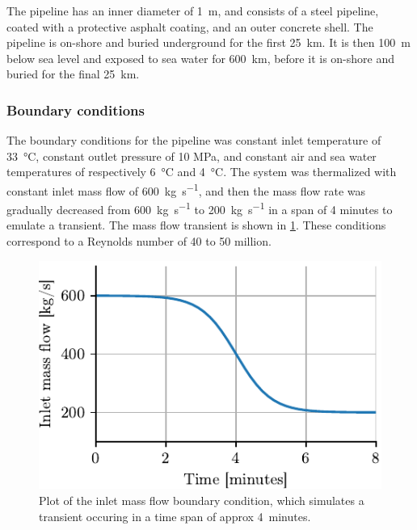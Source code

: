 The pipeline has an inner diameter of \SI{1}{\meter}, and consists of a steel pipeline, coated with a protective asphalt coating, and an outer concrete shell. The pipeline is on-shore and buried underground for the first \SI{25}{\kilo\meter}. It is then \SI{100}{\meter} below sea level and exposed to sea water for \SI{600}{\kilo\meter}, before it is on-shore and buried for the final \SI{25}{\kilo\meter}.

\subsubsection{Boundary conditions}
The boundary conditions for the pipeline was constant inlet temperature of \SI{33}{\degreeCelsius}, constant outlet pressure of 10 MPa, and constant air and sea water temperatures of respectively \SI{6}{\degreeCelsius} and \SI{4}{\degreeCelsius}. The system was thermalized with constant inlet mass flow of \SI{600}{\kg\per\second}, and then the mass flow rate was gradually decreased from \SI{600}{\kg\per\second} to \SI{200}{\kg\per\second} in a span of 4 minutes to emulate a transient. The mass flow transient is shown in \cref{fig:massFlowBoundaryCondition}. These conditions correspond to a Reynolds number of 40 to 50 million.

\begin{figure}[ht]%
    \centering%
    \includegraphics{figures/inlet_mass_flow.pdf}%
    \caption{%
        Plot of the inlet mass flow boundary condition, which simulates a transient occuring in a time span of approx 4~minutes.
        \label{fig:massFlowBoundaryCondition}%
    }%
\end{figure}%

